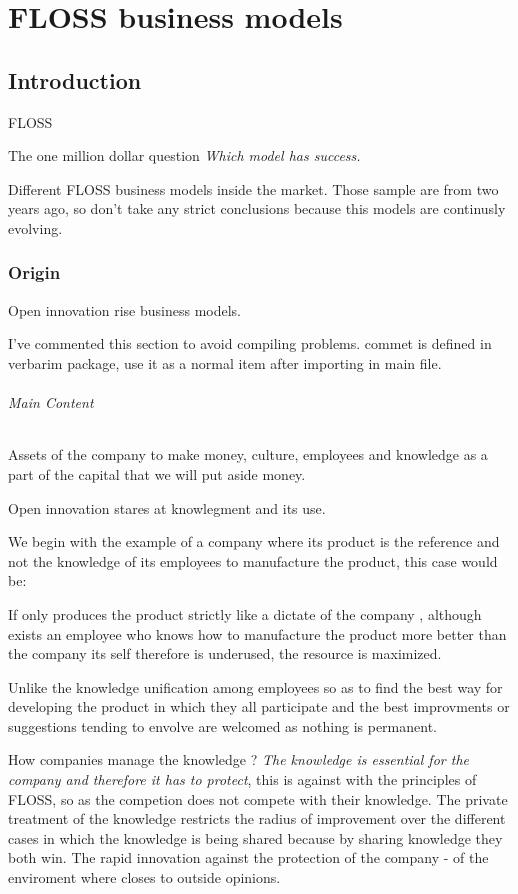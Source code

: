 \chapter{FLOSS business models}

\section{Introduction}\label{lesson-4-introduction}

FLOSS 

The one million dollar question \emph{Which model has success.}

Different FLOSS business models inside the market. Those sample are from two years ago, so don't take any strict conclusions because this models are continusly evolving.

\subsection{Origin}\label{lesson-4-origin}

Open innovation rise business models.

 I've commented this section to avoid compiling problems. commet is defined in
 verbarim package, use it as a normal item after importing in main file.

\subparagraph{Main Content}

Assets of the company to make money, culture, employees and knowledge as a part
of the capital that we will put aside money.

Open innovation stares at knowlegment and its use.

We begin with the example of a company where its product is the reference and
not the knowledge of its employees to manufacture the product, this case would
be:

If only produces the product strictly like a dictate of the company , although
exists an employee who knows how to manufacture the product more better than the
company its self therefore is underused, the resource is maximized.


Unlike the knowledge unification among employees so as to find the best way for
developing the product in which they all participate and the best improvments or
suggestions tending to envolve are welcomed as nothing is permanent.

How companies manage the knowledge ? \emph{The knowledge is essential for the
company and therefore it has to protect}, this is against with the
principles of  FLOSS, so as the competion does not compete with their
knowledge. The private treatment of the knowledge restricts the radius of
improvement over the different cases in which the knowledge is being shared because by sharing knowledge they both
win. The rapid innovation against the protection of the company - of the
enviroment where closes to outside opinions.

